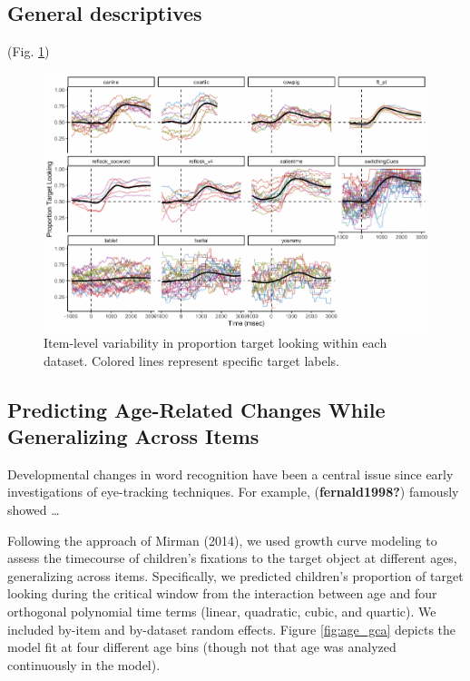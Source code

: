 \documentclass[10pt, letterpaper]{article}
\newenvironment{CodeChunk}{}{}
\begin{document}
\hypertarget{general-descriptives}{%
\subsection{General descriptives}\label{general-descriptives}}

(Fig. \ref{fig:peekbank_item_vis})

\begin{CodeChunk}
\begin{figure}[h]

{\centering \includegraphics{figs/peekbank_item_vis-1}

}

\caption[Item-level variability in proportion target looking within each dataset]{Item-level variability in proportion target looking within each dataset. Colored lines represent specific target labels.}\label{fig:peekbank_item_vis}
\end{figure}
\end{CodeChunk}

\hypertarget{predicting-age-related-changes-while-generalizing-across-items}{%
\subsection{Predicting Age-Related Changes While Generalizing Across
Items}\label{predicting-age-related-changes-while-generalizing-across-items}}

Developmental changes in word recognition have been a central issue
since early investigations of eye-tracking techniques. For example,
(\textbf{fernald1998?}) famously showed \ldots{}

Following the approach of Mirman (2014), we used growth curve modeling
to assess the timecourse of children's fixations to the target object at
different ages, generalizing across items. Specifically, we predicted
children's proportion of target looking during the critical window from
the interaction between age and four orthogonal polynomial time terms
(linear, quadratic, cubic, and quartic). We included by-item and
by-dataset random effects. Figure \ref{fig:age_gca} depicts the model
fit at four different age bins (though not that age was analyzed
continuously in the model).
\end{document}
